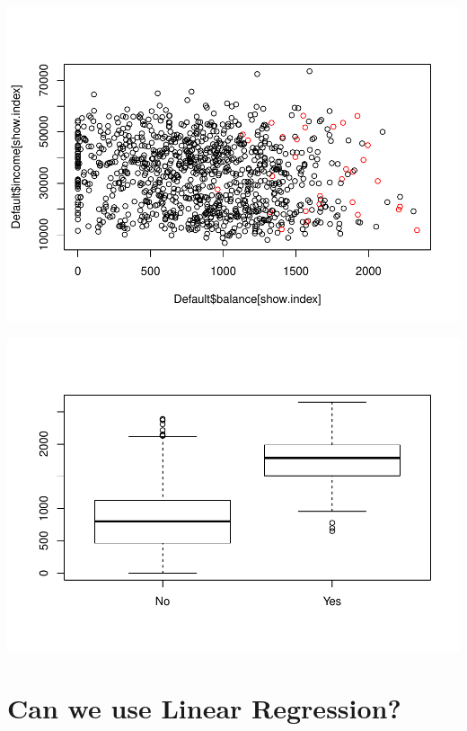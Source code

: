 \documentclass[]{report}
\newenvironment{Shaded}{\begin{snugshade}}{\end{snugshade}}
\newcommand{\KeywordTok}[1]{\textcolor[rgb]{0.13,0.29,0.53}{\textbf{#1}}}
\newcommand{\StringTok}[1]{\textcolor[rgb]{0.31,0.60,0.02}{#1}}
\newcommand{\OperatorTok}[1]{\textcolor[rgb]{0.81,0.36,0.00}{\textbf{#1}}}
\newcommand{\NormalTok}[1]{#1}
\begin{document}
\includegraphics{MyBook_files/figure-latex/unnamed-chunk-119-1.pdf}

\begin{Shaded}
\end{Shaded}

\includegraphics{MyBook_files/figure-latex/unnamed-chunk-119-2.pdf}

\section{Can we use Linear
Regression?}\label{can-we-use-linear-regression}
\end{document}
